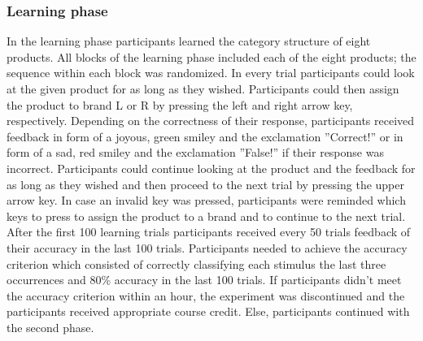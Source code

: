 \documentclass[a4paper,man,natbib]{apa6}
\begin{document}
\subsubsection{Learning phase}
In the learning phase participants learned the category structure of eight products. All blocks of the learning phase included each of the eight products; the sequence within each block was randomized. In every trial participants could look at the given product for as long as they wished. Participants could then assign the product to brand L or R by pressing the left and right arrow key, respectively. Depending on the correctness of their response, participants received feedback in form of a joyous, green smiley and the exclamation ''Correct!'' or in form of a sad, red smiley and the exclamation ''False!'' if their response was incorrect. Participants could continue looking at the product and the feedback for as long as they wished and then proceed to the next trial by pressing the upper arrow key. In case an invalid key was pressed, participants were reminded which keys to press to assign the product to a brand and to continue to the next trial. After the first 100 learning trials participants received every 50 trials feedback of their accuracy in the last 100 trials. Participants needed to achieve the accuracy criterion which consisted of correctly classifying each stimulus the last three occurrences and 80\% accuracy in the last 100 trials. If participants didn't meet the accuracy criterion within an hour, the experiment was discontinued and the participants received appropriate course credit. Else, participants continued with the second phase.
\end{document}
